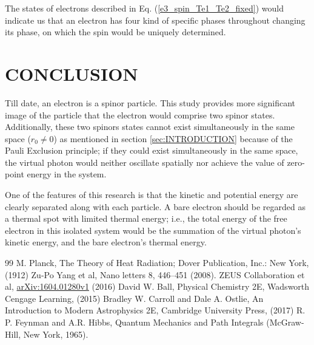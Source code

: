 \documentclass[%
 reprint,
 amsmath,amssymb,
 aps,
]{revtex4-1}
\numberwithin{equation}{section}
\begin{document}
    The states of electrons described in Eq. (\ref{e3_spin_Te1_Te2_fixed}) would indicate us that an electron has four kind of specific phases throughout changing its phase, on which the spin would be uniquely determined.

\section{\label{sec:CONCLUSION}CONCLUSION}

    Till date, an electron is a spinor particle. This study provides more significant image of the particle that the electron would comprise two spinor states. Additionally, these two spinors states cannot exist simultaneously in the same space ($r_{0} \neq 0$) as mentioned in section \ref{sec:INTRODUCTION} because of the Pauli Exclusion principle; if they could exist simultaneously in the same space, the virtual photon would neither oscillate spatially nor achieve the value of zero-point energy in the system.

    One of the features of this research is that the kinetic and potential energy are clearly separated along with each particle. A bare electron should be regarded as a thermal spot with limited thermal energy; i.e., the total energy of the free electron in this isolated system would be the summation of the virtual photon's kinetic energy, and the bare electron's thermal energy.

\begin{thebibliography}{99}
     M. Planck, The Theory of Heat Radiation; Dover Publication, Inc.: New York, (1912)
     Zu-Po Yang et al, Nano letters 8, 446--451 (2008).
     ZEUS Collaboration et al, \href{https://arxiv.org/abs/1604.01280}{arXiv:1604.01280v1} (2016)
     David W. Ball, Physical Chemistry 2E, Wadsworth Cengage Learning, (2015)
     Bradley W. Carroll and Dale A. Ostlie, An Introduction to Modern Astrophysics 2E, Cambridge University Press, (2017)
     R. P. Feynman and A.R. Hibbs, Quantum Mechanics and Path Integrals (McGraw-Hill, New York, 1965).
\end{thebibliography}

\end{document}
